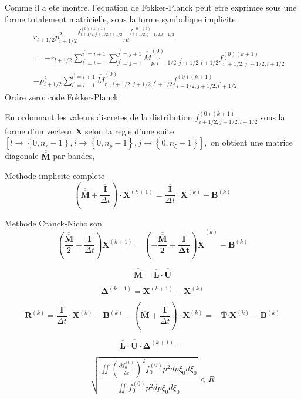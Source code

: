 Comme il a ete montre, l'equation de Fokker-Planck peut etre exprimee
sous une forme totalement matricielle, sous la forme symbolique implicite
\begin{eqnarray*}
 &  & r_{l+1/2}p_{i+1/2}^{2}\frac{f_{i+1/2,j+1/2,l+1/2}^{\left(0\right)\left(k+1\right)}-f_{i+1/2,j+1/2,l+1/2}^{\left(0\right)\left(k\right)}}{\Delta t}\\
 &  & =-r_{l+1/2}\sum_{i^{\prime}=i-1}^{i^{\prime}=i+1}\sum_{j^{\prime}=j-1}^{j^{\prime}=j+1}\overline{\overline{M}}_{p,i^{\prime}+1/2,j^{\prime}+1/2,l+1/2}^{\left(0\right)}f_{i^{\prime}+1/2,j^{\prime}+1/2,l+1/2}^{\left(0\right)\left(k+1\right)}\\
 &  & -p_{i+1/2}^{2}\sum_{l^{\prime}=l-1}^{l^{\prime}=l+1}\overline{\overline{M}}_{r,,i+1/2,j+1/2,l^{\prime}+1/2}^{\left(0\right)}f_{i+1/2,j+1/2,l^{\prime}+1/2}^{\left(0\right)\left(k+1\right)}\end{eqnarray*}
Ordre zero: code Fokker-Planck

En ordonnant les valeurs discretes de la distribution $f_{i+1/2,j+1/2,l+1/2}^{\left(0\right)\left(k+1\right)}$
sous la forme d'un vecteur $\mathbf{X}$ selon la regle d'une suite
$\left[l\rightarrow\left\{ 0,n_{r}-1\right\} ,i\rightarrow\left\{ 0,n_{p}-1\right\} ,j\rightarrow\left\{ 0,n_{\xi}-1\right\} \right],$
on obtient une matrice diagonale $\overline{\overline{\mathbf{M}}}$
par bandes,

Methode implicite complete \[
\left(\overline{\overline{\mathbf{M}}}+\frac{\overline{\overline{\mathbf{I}}}}{\Delta t}\right)\cdot\mathbf{X}^{\left(k+1\right)}\mathbf{=}\frac{\overline{\overline{\mathbf{I}}}}{\Delta t}\cdot\mathbf{X}^{\left(k\right)}-\mathbf{B}^{\left(k\right)}\]


Methode Cranck-Nicholson \[
\left(\frac{\overline{\overline{\mathbf{M}}}}{2}+\frac{\overline{\overline{\mathbf{I}}}}{\Delta t}\right)\mathbf{X}^{\left(k+1\right)}\mathbf{=\left(-\frac{\overline{\overline{\mathbf{M}}}}{2}+\frac{\overline{\overline{\mathbf{I}}}}{\Delta t}\right)X}^{\left(k\right)}-\mathbf{B}^{\left(k\right)}\]


\[
\overline{\overline{\mathbf{M}}}=\overline{\overline{\mathbf{L}}}\cdot\overline{\overline{\mathbf{U}}}\]


\[
\mathbf{\Delta}^{\left(k+1\right)}\mathbf{=X}^{\left(k+1\right)}-\mathbf{X}^{\left(k\right)}\]


\[
\mathbf{R}^{\left(k\right)}\mathbf{=}\frac{\overline{\overline{\mathbf{I}}}}{\Delta t}\cdot\mathbf{X}^{\left(k\right)}-\mathbf{B}^{\left(k\right)}-\left(\overline{\overline{\mathbf{M}}}+\frac{\overline{\overline{\mathbf{I}}}}{\Delta t}\right)\cdot\mathbf{X}^{\left(k\right)}=-\overline{\overline{\mathbf{T}}}\mathbf{\cdot X}^{\left(k\right)}-\mathbf{B}^{\left(k\right)}\]


\[
\overline{\overline{\mathbf{L}}}\cdot\overline{\overline{\mathbf{U}}}\cdot\mathbf{\Delta}^{\left(k+1\right)}=\]


\[
\sqrt{\frac{\iint\left(\frac{\partial f_{0}^{\left(0\right)}}{\partial t}\right)^{2}f_{0}^{\left(0\right)}p^{2}dp\xi_{0}d\xi_{0}}{\iint f_{0}^{\left(0\right)}p^{2}dp\xi_{0}d\xi_{0}}}<R\]

